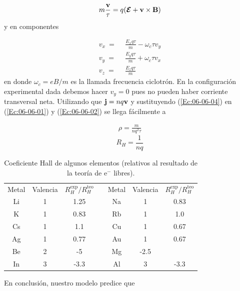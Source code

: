 \begin{eqnarray}
	m \frac{\mathbf{v}}{\tau} = q (\boldsymbol{\mathcal{E}} + \mathbf{v} \times \mathbf{B})
\end{eqnarray}
y en componentes

\begin{equation}
\begin{split}
	v_x \  = \  & \ \frac{E_x q\tau}{m} - \omega_c \tau v_y \\
	v_y \  = \  & \ \frac{E_y q\tau}{m} + \omega_c \tau v_x \\
	v_z \  = \  & \ \frac{E_z q\tau}{m}  \label{Ec:06-06-04}
\end{split}
\end{equation}
en donde $\omega_c = eB/m$ es la llamada frecuencia ciclotrón. En la configuración experimental dada debemos hacer $v_y = 0$ pues no pueden haber corriente transversal neta. Utilizando que $\mathbf{j} = nq\mathbf{v}$ y sustituyendo  (\ref{Ec:06-06-04}) en (\ref{Ec:06-06-01}) y (\ref{Ec:06-06-02}) se llega fácilmente a 

\begin{eqnarray*}
	\rho =  \frac{m}{nq^2\tau}
\end{eqnarray*}
\begin{equation}
	R_H=\frac{1}{nq} \label{Ec:06-06-05}
\end{equation}

\begin{table}[h!] \centering
\begin{tabular}{ccc c ccc}
	Metal & Valencia & $R_H^{\text{exp}}/R_H^{\text{teo}}$ & & Metal & Valencia & $R_H^{\text{exp}}/R_H^{\text{teo}}$ \\ \cline{1-3} \cline{5-7} 
	Li & 1 & 1.25 & & Na & 1 & 0.83 \\
	K & 1 & 0.83 & & Rb & 1 & 1.0 \\
	Cs & 1 & 1.1 & & Cu & 1 & 0.67 \\
	Ag & 1 & 0.77 & & Au & 1 & 0.67 \\
	Be & 2 & -5 & & Mg & -2.5 \\
	In & 3 & -3.3 & & Al & 3 & -3.3 
\end{tabular}
\caption{Coeficiente Hall de algunos elementos (relativos al resultado de la teoría de e$^-$ libres).}
\label{Tab:06-03}
\end{table}

En conclusión, nuestro modelo predice que 

